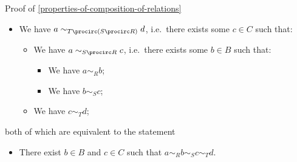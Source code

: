\begin{Proof}{Proof of \cref{properties-of-composition-of-relations}}
\begin{itemize}
\begin{itemize}
            \end{itemize}
        \item We have $a\sim_{T\procirc(S\procirc R)}d$, i.e.\ there exists some $c\in C$ such that:
            \begin{itemize}
                \item We have $a\sim_{S\procirc R}c$, i.e.\ there exists some $b\in B$ such that:
                    \begin{itemize}
                        \item We have $a\sim_{R}b$;
                        \item We have $b\sim_{S}c$;
                    \end{itemize}
                \item We have $c\sim_{T}d$;
            \end{itemize}
    \end{itemize}
    both of which are equivalent to the statement
    \begin{itemize}
        \item There exist $b\in B$ and $c\in C$ such that $a\sim_{R}b\sim_{S}c\sim_{T}d$.
    \end{itemize}


\end{Proof}
